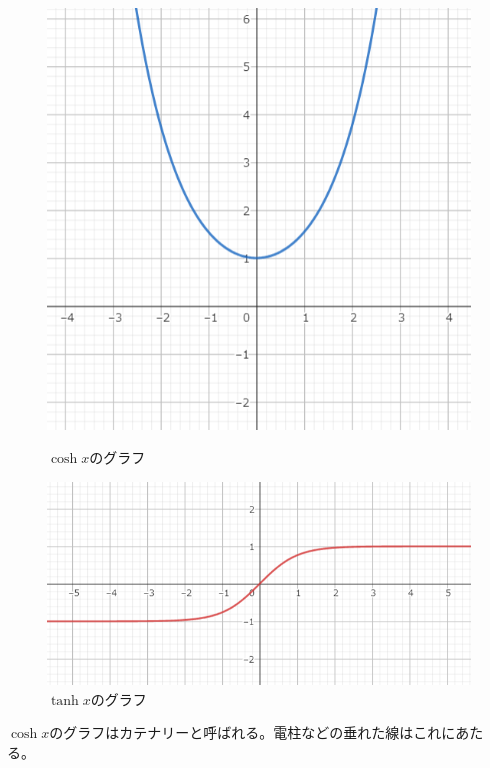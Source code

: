 \documentclass[a4j,dvipdfmx]{jsarticle}
\begin{document}
\begin{figure}[h]
\begin{minipage}{5cm}
                        \includegraphics[keepaspectratio,scale=0.3]{img/QuuNote/CoshFuncGraph.png}
                        \caption{$\cosh x$のグラフ}
                    \end{minipage}
                    \begin{minipage}{5cm}
                        \centering
                        \includegraphics[keepaspectratio,scale=0.3]{img/QuuNote/TanhFuncGraph.png}
                        \caption{$\tanh x$のグラフ}
                    \end{minipage}
                \end{figure}

                $\cosh x$のグラフはカテナリーと呼ばれる。電柱などの垂れた線はこれにあたる。
            \clearpage
\end{document}
